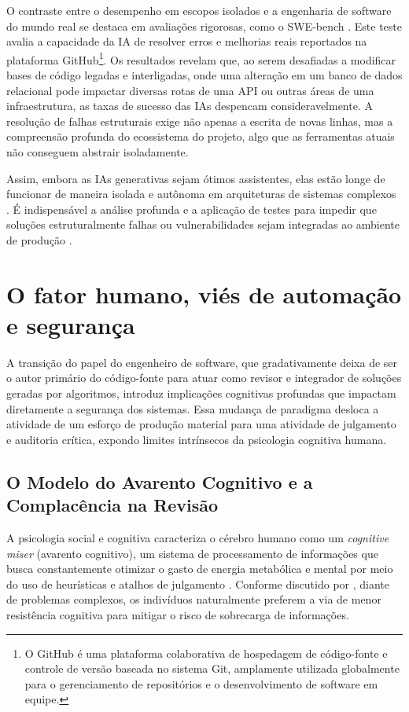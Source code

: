 O contraste entre o desempenho em escopos isolados e a engenharia de 
software do mundo real se destaca em avaliações rigorosas, como o SWE-bench 
\cite{jimenez2024}. Este teste avalia a capacidade da IA de resolver erros e 
melhorias reais reportados na plataforma GitHub\footnote{O GitHub é uma plataforma colaborativa de hospedagem de código-fonte e controle de versão baseada no sistema Git, amplamente utilizada globalmente para o gerenciamento de repositórios e o desenvolvimento de software em equipe.}. Os resultados revelam que, ao 
serem desafiadas a modificar bases de código legadas e interligadas, onde uma 
alteração em um banco de dados relacional pode impactar diversas rotas de uma 
API ou outras áreas de uma infraestrutura, as taxas de sucesso das IAs despencam 
consideravelmente. A resolução de falhas estruturais exige não apenas a escrita de 
novas linhas, mas a compreensão profunda do ecossistema do projeto, algo que as 
ferramentas atuais não conseguem abstrair isoladamente. 

Assim, embora as IAs generativas sejam ótimos assistentes, elas 
estão longe de funcionar de maneira isolada e autônoma em arquiteturas de 
sistemas complexos \cite{jimenez2024}. É indispensável a análise profunda e 
a aplicação de testes para impedir que soluções estruturalmente falhas ou 
vulnerabilidades sejam integradas ao ambiente de produção \cite{pearce2022, perry2023}.

\section{O fator humano, viés de automação e segurança}
A transição do papel do engenheiro de software, que gradativamente deixa de ser o autor primário do código-fonte para atuar como revisor e integrador de soluções geradas por algoritmos, introduz implicações cognitivas profundas que impactam diretamente a segurança dos sistemas. Essa mudança de paradigma desloca a atividade de um esforço de produção material para uma atividade de julgamento e auditoria crítica, expondo limites intrínsecos da psicologia cognitiva humana.

\subsection{O Modelo do Avarento Cognitivo e a Complacência na Revisão}

A psicologia social e cognitiva caracteriza o cérebro humano como um \textit{cognitive miser} (avarento cognitivo), um sistema de processamento de informações que busca constantemente otimizar o gasto de energia metabólica e mental por meio do uso de heurísticas e atalhos de julgamento \cite{fiske1984}. Conforme discutido por , diante de problemas complexos, os indivíduos naturalmente preferem a via de menor resistência cognitiva para mitigar o risco de sobrecarga de informações. 

